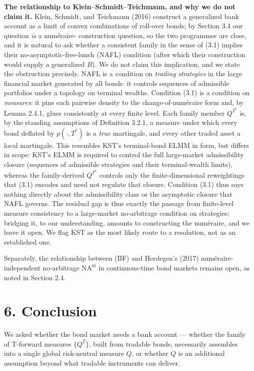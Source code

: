 \documentclass[
]{article}
\begin{document}
\textbf{The relationship to Klein--Schmidt--Teichmann, and why we do not
claim it.} Klein, Schmidt, and Teichmann (2016) construct a generalized
bank account as a limit of convex combinations of roll-over bonds; by
Section 3.4 our question \emph{is} a numéraire- construction question,
so the two programmes are close, and it is natural to ask whether a
consistent family in the sense of (3.1) implies their
no-asymptotic-free-lunch (NAFL) condition (after which their
construction would supply a generalized \(B\)). We do not claim this
implication, and we state the obstruction precisely. NAFL is a condition
on \emph{trading strategies} in the large financial market generated by
all bonds: it controls sequences of admissible portfolios under a
topology on terminal wealths. Condition (3.1) is a condition on
\emph{measures}: it pins each pairwise density to the
change-of-numéraire form and, by Lemma 2.4.1, glues consistently at
every finite level. Each family member \(Q^{T^*}\) is, by the standing
assumptions of Definition 3.2.1, a measure under which every bond
deflated by \(p(\cdot, T^*)\) is a \emph{true} martingale, and every
other traded asset a local martingale. This resembles KST's
terminal-bond ELMM in form, but differs in scope: KST's ELMM is required
to control the full large-market admissibility closure (sequences of
admissible strategies and their terminal-wealth limits), whereas the
family-derived \(Q^{T^*}\) controls only the finite-dimensional
reweightings that (3.1) encodes and need not regulate that closure.
Condition (3.1) thus says nothing directly about the admissibility class
or the asymptotic closure that NAFL governs. The residual gap is thus
exactly the passage from finite-level measure consistency to a
large-market no-arbitrage condition on strategies; bridging it, to our
understanding, amounts to constructing the numéraire, and we leave it
open. We flag KST as the most likely route to a resolution, not as an
established one.

Separately, the relationship between (BF) and Herdegen's (2017)
numéraire-independent no-arbitrage \(\text{NA}^{\text{ni}}\) in
continuous-time bond markets remains open, as noted in Section 2.4.

\section{6. Conclusion}\label{conclusion}

We asked whether the bond market needs a bank account --- whether the
family of T-forward measures \(\{Q^T\}\), built from tradable bonds,
necessarily assembles into a single global risk-neutral measure \(Q\),
or whether \(Q\) is an additional assumption beyond what tradable
instruments can deliver.
\end{document}
